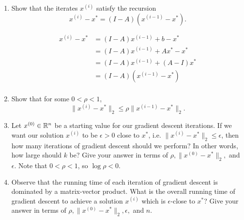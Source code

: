 \begin{enumerate}[label=(\alph*)]
\begin{mdframed}
    \end{mdframed}

  \item Show that the iterates $x^{(i)}$ satisfy the recursion
    $$x^{(i)} - x^* = (I-A)(x^{(i-1)} - x^*).$$
    \begin{mdframed}
      \begin{align*}
        x^{(i)} - x^*
        &= (I - A)x^{(i-1)} + b - x^* \\
        &= (I - A)x^{(i-1)} + Ax^* - x^* \\
        &= (I - A)x^{(i-1)} + (A - I)x^* \\
        &= (I - A)(x^{(i-1)} - x^*) \\
      \end{align*}
    \end{mdframed}

  \item Show that for some $0 < \rho < 1$,
    $$\lVert x^{(i)} - x^* \rVert_2 \leq \rho \lVert x^{(i-1)} - x^*
    \rVert_2.$$
    \begin{mdframed}
    \solution %
    \end{mdframed}

  \item Let $x^{(0)} \in \mathbb{R}^n$ be a starting value for our gradient descent
    iterations. If we want our solution $x^{(i)}$ to be $\epsilon > 0$ close to
    $x^*$, i.e. $\lVert x^{(i)} - x^* \rVert_2 \leq \epsilon$, then how many
    iterations of gradient descent should we perform? In other words, how large
    should $k$ be? Give your answer in terms of
    $\rho, \lVert x^{(0)} - x^*\rVert_2, $ and $\epsilon$. Note that
    $0 < \rho < 1$, so $\log \rho < 0$.
    \begin{mdframed}
    \solution %
    \end{mdframed}

  \item Observe that the running time of each iteration of gradient descent is
    dominated by a matrix-vector product. What is the overall running time of
    gradient descent to achieve a solution $x^{(i)}$ which is $\epsilon$-close
    to $x^*$? Give your answer in terms of
    $\rho, \lVert x^{(0)} - x^*\rVert_2, \epsilon,$ and $n$.
    \begin{mdframed}
    \solution %
    \end{mdframed}
\end{enumerate}

\newpage
